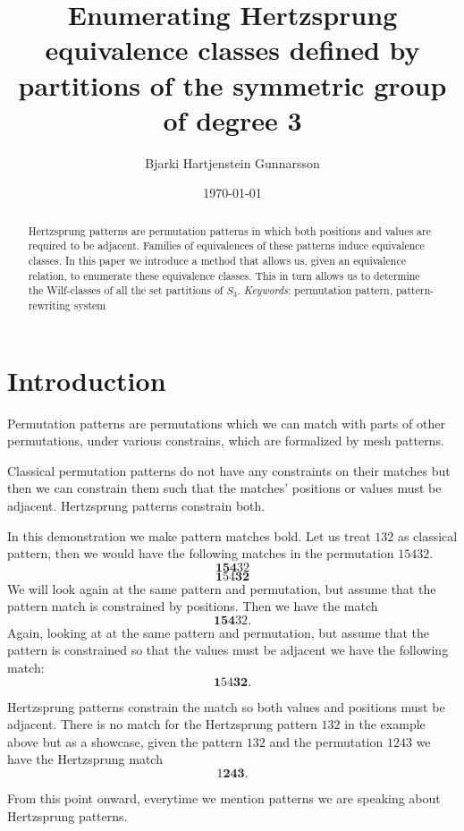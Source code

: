 \documentclass[a4paper, 11pt, english]{article}
\newcommand{\breath}{\vspace{6pt plus 2pt minus 1pt}\noindent}
\theoremstyle{definition}
\newcommand{\Sym}{S}
\begin{document}
\title{Enumerating Hertzsprung equivalence classes defined by partitions of the symmetric group of degree 3}
\author{Bjarki Hartjenstein Gunnarsson}
\date{\today}
\maketitle

\begin{abstract}
    Hertzsprung patterns are permutation patterns in which both positions and
    values are required to be adjacent. Families of equivalences of these
    patterns induce equivalence classes. In this paper we introduce a method
    that allows us, given an equivalence relation, to enumerate these
    equivalence classes. This in turn allows us to determine the Wilf-classes of
    all the set partitions of $\Sym_3$.
    \breath \emph{Keywords}: permutation pattern, pattern-rewriting system
\end{abstract}

\section{Introduction}
Permutation patterns are permutations which we can match with parts of other
permutations, under various constrains, which are formalized by mesh patterns.
\cite{claesson:2011}

Classical permutation patterns do not have any constraints on their matches but then we can
constrain them such that the matches' positions or values must be adjacent.
Hertzsprung patterns constrain both. 

In this demonstration we make pattern matches bold.  Let us treat $132$ as classical
pattern, then we would have the following matches in the permutation $15432$.
\[
    \bm{154}32
\]
\[
    \bm{1}54\bm{32}
\]
We will look again at the same pattern and permutation, but assume that the
pattern match is constrained by positions. Then we have the match
\[
    \bm{154}32.
\]
Again, looking at at the same pattern and permutation, but assume that the
pattern is constrained so that the values must be adjacent we have the following
match:
\[
    \bm{1}54\bm{32}.
\]

Hertzsprung patterns constrain the match so both values and positions must be
adjacent. There is no match for the Hertzsprung pattern $132$ in the example
above but as a showcase, given the pattern $132$ and the permutation $1243$ we
have the Hertzsprung match
\[
    1\bm{243}.
\]

From this point onward, everytime we mention patterns we are speaking about
Hertzsprung patterns.
\end{document}
